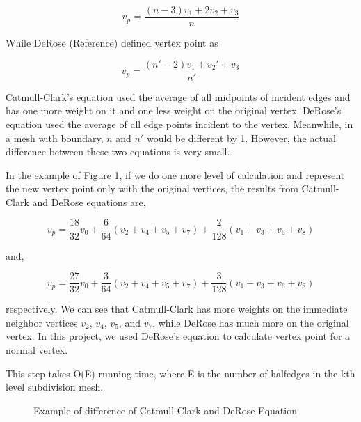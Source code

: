 \documentclass[12pt]{article}
\begin{document}
$$v_p=\frac{(n - 3)v_1 + 2v_2 + v_3}{n}$$

While DeRose (Reference) defined vertex point as

$$v_p=\frac{(n' - 2)v_1 + v_2' + v_3}{n'}$$

Catmull-Clark's equation used the average of all midpoints of incident edges and has one more weight on it and one less weight on the original vertex. DeRose's equation used the average of all edge points incident to the vertex. Meanwhile, in a mesh with boundary, $n$ and $n'$ would be different by 1. However, the actual difference between these two equations is very small. 

In the example of Figure \ref{figure:differenceCandD}, if we do one more level of calculation and represent the new vertex point only with the original vertices, the results from Catmull-Clark and DeRose equations are,

$$v_p=\frac{18}{32}v_0 + \frac{6}{64}(v_2 + v_4 + v_5 + v_7) + \frac{2}{128}(v_1 + v_3 + v_6 + v_8)$$

and,

$$v_p=\frac{27}{32}v_0 + \frac{3}{64}(v_2 + v_4 + v_5 + v_7) + \frac{3}{128}(v_1 + v_3 + v_6 + v_8)$$

respectively. We can see that Catmull-Clark has more weights on the immediate neighbor vertices $v_2$, $v_4$, $v_5$, and $v_7$, while DeRose has much more on the original vertex. In this project, we used DeRose's equation to calculate vertex point for a normal vertex.

This step takes O(E) running time, where E is the number of halfedges in the kth level subdivision mesh.

\begin{figure}[ht]
  \centering
  \caption{Example of difference of Catmull-Clark and DeRose Equation}
  \label{figure:differenceCandD}
\end{figure}
\end{document}
